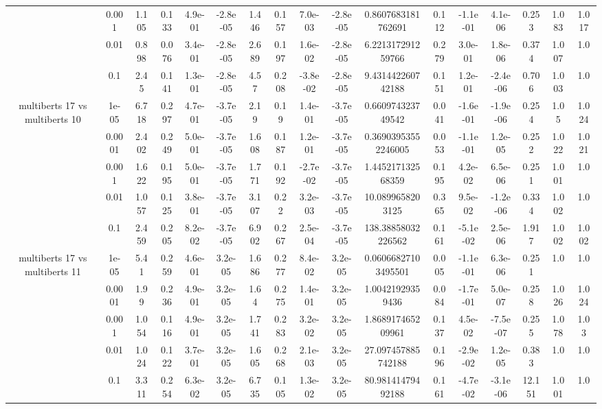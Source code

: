\begin{tabular}{|c|c|c|c|c|c|c|c|c|c|c|c|c|c|c|c|c|}
 & 0.001 & 1.105 & 0.133 & 4.9e-01 & -2.8e-05 & 1.446 & 0.157 & 7.0e-03 & -2.8e-05 & 0.8607683181762691 & 0.112 & -1.1e-01 & 4.1e-06 & 0.253 & 1.083 & 1.017 \\
 & 0.01 & 0.898 & 0.076 & 3.4e-01 & -2.8e-05 & 2.689 & 0.197 & 1.6e-02 & -2.8e-05 & 6.221317291259766 & 0.279 & 3.0e-01 & 1.8e-06 & 0.374 & 1.007 & 1.0 \\
 & 0.1 & 2.45 & 0.141 & 1.3e-01 & -2.8e-05 & 4.57 & 0.208 & -3.8e-02 & -2.8e-05 & 9.431442260742188 & 0.151 & 1.2e-01 & -2.4e-06 & 0.706 & 1.003 & 1.0 \\
\hline
\multirow{5}{*}{multiberts 17 vs multiberts 10} & 1e-05 & 6.718 & 0.297 & 4.7e-01 & -3.7e-05 & 2.19 & 0.19 & 1.4e-01 & -3.7e-05 & 0.660974323749542 & 0.041 & -1.6e-01 & -1.9e-06 & 0.254 & 1.05 & 1.024 \\
 & 0.0001 & 2.402 & 0.249 & 5.0e-01 & -3.7e-05 & 1.608 & 0.187 & 1.2e-01 & -3.7e-05 & 0.36903953552246005 & 0.053 & -1.1e-01 & 1.2e-05 & 0.252 & 1.022 & 1.021 \\
 & 0.001 & 1.622 & 0.195 & 5.0e-01 & -3.7e-05 & 1.771 & 0.192 & -2.7e-02 & -3.7e-05 & 1.445217132568359 & 0.195 & 4.2e-02 & 6.5e-06 & 0.251 & 1.001 & 1.0 \\
 & 0.01 & 1.057 & 0.125 & 3.8e-01 & -3.7e-05 & 3.107 & 0.22 & 3.2e-03 & -3.7e-05 & 10.0899658203125 & 0.365 & 9.5e-02 & -1.2e-06 & 0.334 & 1.002 & 1.0 \\
 & 0.1 & 2.459 & 0.205 & 8.2e-02 & -3.7e-05 & 6.902 & 0.267 & 2.5e-04 & -3.7e-05 & 138.38858032226562 & 0.161 & -5.1e-02 & 2.5e-06 & 1.917 & 1.002 & 1.002 \\
\hline
\multirow{5}{*}{multiberts 17 vs multiberts 11} & 1e-05 & 5.41 & 0.259 & 4.6e-01 & 3.2e-05 & 1.686 & 0.277 & 8.4e-02 & 3.2e-05 & 0.06066827103495501 & 0.005 & -1.1e-01 & 6.3e-06 & 0.251 & 1.0 & 1.0 \\
 & 0.0001 & 1.99 & 0.236 & 4.9e-01 & 3.2e-05 & 1.64 & 0.275 & 1.4e-01 & 3.2e-05 & 1.00421929359436 & 0.084 & -1.7e-01 & 5.0e-07 & 0.258 & 1.026 & 1.024 \\
 & 0.001 & 1.054 & 0.116 & 4.9e-01 & 3.2e-05 & 1.741 & 0.283 & 3.2e-02 & 3.2e-05 & 1.868917465209961 & 0.137 & 4.5e-02 & -7.5e-07 & 0.255 & 1.078 & 1.03 \\
 & 0.01 & 1.024 & 0.122 & 3.7e-01 & 3.2e-05 & 1.605 & 0.268 & 2.1e-03 & 3.2e-05 & 27.097457885742188 & 0.196 & -2.9e-02 & 1.2e-05 & 0.383 & 1.0 & 1.0 \\
 & 0.1 & 3.311 & 0.254 & 6.3e-02 & 3.2e-05 & 6.735 & 0.105 & 1.3e-02 & 3.2e-05 & 80.98141479492188 & 0.161 & -4.7e-02 & -3.1e-06 & 12.151 & 1.001 & 1.0 \\

\end{tabular}
